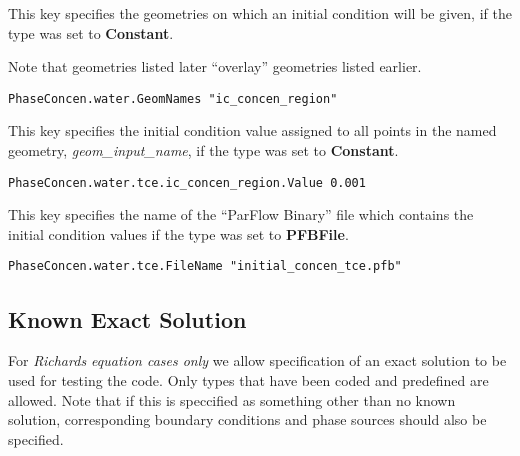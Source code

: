 {
This key specifies the geometries on which an initial condition will be
given, if the type was set to {\bf Constant}.

Note that geometries listed later ``overlay'' geometries listed earlier.
}
\begin{display}\begin{verbatim}
PhaseConcen.water.GeomNames "ic_concen_region"
\end{verbatim}\end{display}

{
This key specifies the initial condition value assigned to all points in
the named geometry, {\em geom\_input\_name}, if the type was set to
{\bf Constant}.
}
\begin{display}\begin{verbatim}
PhaseConcen.water.tce.ic_concen_region.Value 0.001
\end{verbatim}\end{display}

{
This key specifies the name of the ``ParFlow Binary'' file which
contains the initial condition values if the type was set to {\bf PFBFile}.
}
\begin{display}\begin{verbatim}
PhaseConcen.water.tce.FileName "initial_concen_tce.pfb"
\end{verbatim}\end{display}


\subsection{Known Exact Solution}
\label{ExactSolution}

For {\em Richards equation cases only} we allow specification of an exact
solution to be used for testing the code.  
Only types that have been coded and predefined are allowed.
Note that if this is speccified as something other than no known solution,
corresponding boundary conditions and phase sources should also be specified.

